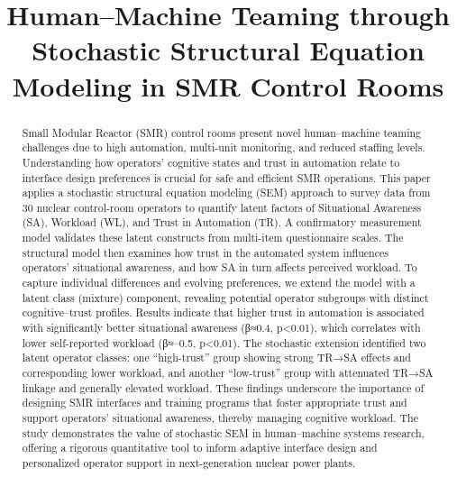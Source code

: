 \documentclass[conference]{IEEEtran}
\begin{document}
\title{ Human–Machine Teaming through Stochastic Structural Equation Modeling in SMR Control Rooms}

\author{
}

\maketitle
\begin{abstract}

Small Modular Reactor (SMR) control rooms present novel human–machine teaming challenges due to high automation, multi-unit monitoring, and reduced staffing levels. Understanding how operators’ cognitive states and trust in automation relate to interface design preferences is crucial for safe and efficient SMR operations. This paper applies a stochastic structural equation modeling (SEM) approach to survey data from 30 nuclear control-room operators to quantify latent factors of Situational Awareness (SA), Workload (WL), and Trust in Automation (TR). A confirmatory measurement model validates these latent constructs from multi-item questionnaire scales. The structural model then examines how trust in the automated system influences operators’ situational awareness, and how SA in turn affects perceived workload. To capture individual differences and evolving preferences, we extend the model with a latent class (mixture) component, revealing potential operator subgroups with distinct cognitive–trust profiles. Results indicate that higher trust in automation is associated with significantly better situational awareness (β≈0.4, p<0.01), which correlates with lower self-reported workload (β≈–0.5, p<0.01). The stochastic extension identified two latent operator classes: one “high-trust” group showing strong TR→SA effects and corresponding lower workload, and another “low-trust” group with attenuated TR→SA linkage and generally elevated workload. These findings underscore the importance of designing SMR interfaces and training programs that foster appropriate trust and support operators’ situational awareness, thereby managing cognitive workload. The study demonstrates the value of stochastic SEM in human–machine systems research, offering a rigorous quantitative tool to inform adaptive interface design and personalized operator support in next-generation nuclear power plants.
\end{abstract}
\end{document}
